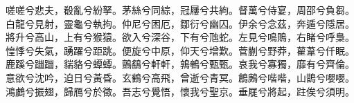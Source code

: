 
\begin{pinyinscope}
嗟嗟兮悲夫，殽亂兮紛拏。茅絲兮同綜，冠屨兮共絇。督萬兮侍宴，周邵兮負芻。白龍兮見射，靈龜兮執拘。仲尼兮困厄，鄒衍兮幽囚。伊余兮念茲，奔遁兮隱居。將升兮高山，上有兮猴猿。欲入兮深谷，下有兮虺蛇。左見兮鳴鵙，右睹兮呼梟。惶悸兮失氣，踴躍兮距跳。便旋兮中原，仰天兮增歎。菅蒯兮野莽，雚葦兮仟眠。鹿蹊兮躖躖，貒貉兮蟫蟫。鸇鷂兮軒軒，鶉鵪兮甄甄。哀我兮寡獨，靡有兮齊倫。意欲兮沈吟，迫日兮黃昏。玄鶴兮高飛，曾逝兮青冥。鶬鶊兮喈喈，山鵲兮嚶嚶。鴻鸕兮振翅，歸鴈兮於徵。吾志兮覺悟，懷我兮聖京。垂屣兮將起，跓俟兮須明。


\end{pinyinscope}